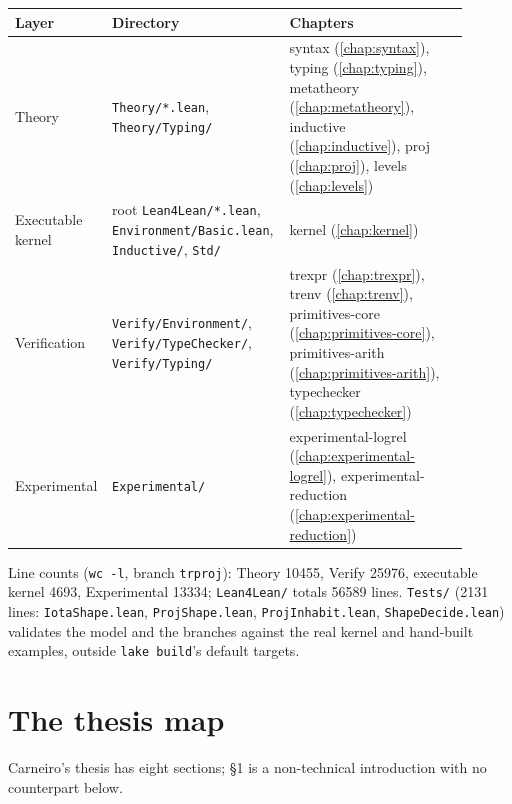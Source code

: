 \par\smallskip\noindent
\begin{tabular}{p{0.14\linewidth}p{0.37\linewidth}p{0.39\linewidth}}
\toprule
Layer & Directory & Chapters \\
\midrule
Theory & \texttt{Theory/*.lean}, \texttt{Theory/Typing/} &
  syntax (\ref{chap:syntax}), typing (\ref{chap:typing}), metatheory (\ref{chap:metatheory}),
  inductive (\ref{chap:inductive}), proj (\ref{chap:proj}), levels (\ref{chap:levels}) \\
Executable kernel & root \texttt{Lean4Lean/*.lean}, \texttt{Environment/Basic.lean},
  \texttt{Inductive/}, \texttt{Std/} & kernel (\ref{chap:kernel}) \\
Verification & \texttt{Verify/Environment/}, \texttt{Verify/TypeChecker/}, \texttt{Verify/Typing/} &
  trexpr (\ref{chap:trexpr}), trenv (\ref{chap:trenv}), primitives-core
  (\ref{chap:primitives-core}), primitives-arith (\ref{chap:primitives-arith}), typechecker
  (\ref{chap:typechecker}) \\
Experimental & \texttt{Experimental/} & experimental-logrel (\ref{chap:experimental-logrel}),
  experimental-reduction (\ref{chap:experimental-reduction}) \\
\bottomrule
\end{tabular}\par\smallskip

Line counts (\texttt{wc -l}, branch \texttt{trproj}): Theory 10455, Verify 25976, executable
kernel 4693, Experimental 13334; \texttt{Lean4Lean/} totals 56589 lines. \texttt{Tests/} (2131
lines: \texttt{IotaShape.lean}, \texttt{ProjShape.lean}, \texttt{ProjInhabit.lean},
\texttt{ShapeDecide.lean}) validates the model and the branches against the real kernel and hand-built
examples, outside \texttt{lake build}'s default targets.

\section{The thesis map}

Carneiro's thesis has eight sections; \S1 is a non-technical introduction with no counterpart
below.

